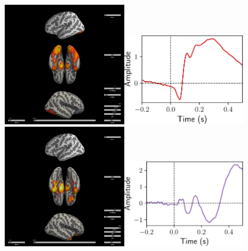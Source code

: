 {\includegraphics[width=0.4\textwidth]{./figures/amvica/amvica_camcan_montage_8.png}\includegraphics[width=0.4\textwidth]{./figures/amvica/amvica_camcan_source_8.pdf} \\
\includegraphics[width=0.4\textwidth]{./figures/amvica/amvica_camcan_montage_9.png}\includegraphics[width=0.4\textwidth]{./figures/amvica/amvica_camcan_source_9.pdf} \\
}